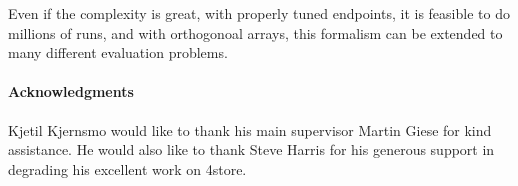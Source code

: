 \documentclass{llncs}
\begin{document}
Even if the complexity is great, with properly tuned endpoints, it is
feasible to do millions of runs, and with orthogonoal arrays, this
formalism can be extended to many different evaluation problems.



\paragraph*{Acknowledgments}

Kjetil Kjernsmo would like to thank his main supervisor Martin Giese
for kind assistance. He would also like to
thank Steve Harris for his generous support in degrading his excellent
work on 4store.


%
%
%


\end{document}
